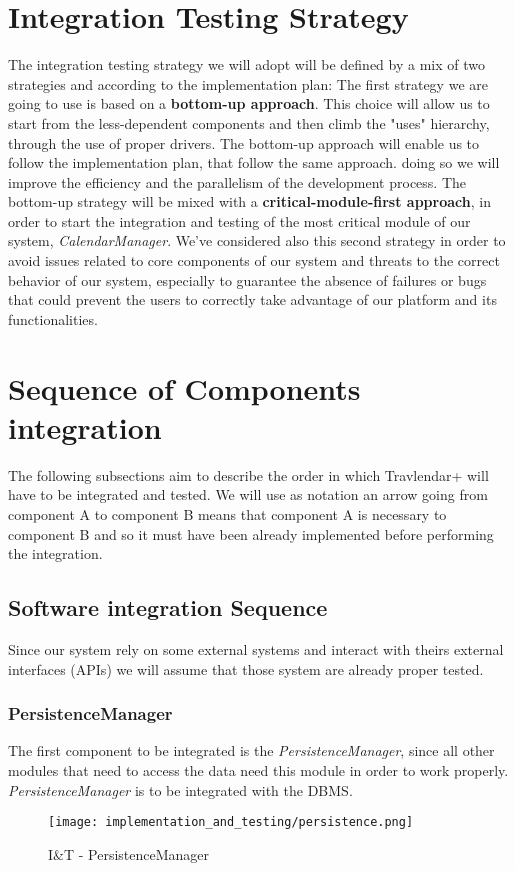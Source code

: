 \section{Integration Testing Strategy}
The integration testing strategy we will adopt will be defined by a mix of two strategies and according to the  implementation plan:
The first strategy we are going to use is based on a \textbf{bottom-up approach}. This choice will allow us to start from the less-dependent components and then climb the "uses" hierarchy, through the use of proper drivers. The bottom-up approach will enable us to follow the implementation plan, that follow the same approach. doing so we will improve the efficiency and the parallelism of the development process. \newline
The bottom-up strategy will be mixed with a \textbf{critical-module-first approach}, in order to start the integration and testing of the most critical module of our system, \textit{CalendarManager}. We've considered also this second strategy in order to avoid issues related to core components of our system and threats to the correct behavior of our system, especially to guarantee the absence of failures or bugs that could prevent the users to correctly take advantage of our platform and its functionalities.

\section{Sequence of Components integration}
The following subsections aim to describe the order in which Travlendar+ will have to be integrated and tested. We will use as notation an arrow going from component A to component B means that component A is necessary to component B and so it must have been already implemented before performing the integration.

\subsection{Software integration Sequence}
Since our system rely on some external systems and interact with theirs external interfaces (APIs) we will assume that those system are already proper tested.
\subsubsection{PersistenceManager}
The first component to be integrated is the \textit{PersistenceManager}, since all other modules that need to access the data need this module in order to work properly. \textit{PersistenceManager} is to be integrated with the DBMS.
\begin{figure}[H]
	\begin{center}
		\texttt{[image: implementation\_and\_testing/persistence.png]}
	\end{center}
	\caption{I\&T - PersistenceManager}
\end{figure}

